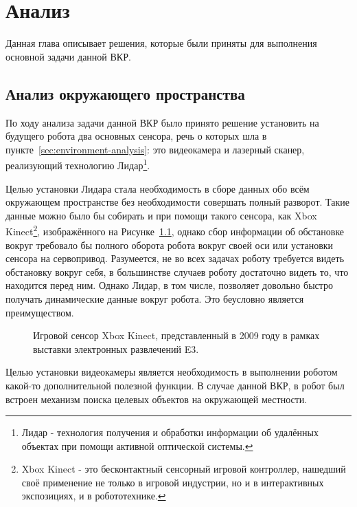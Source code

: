 \chapter{Анализ}\label{ch:ch2}

Данная глава описывает решения, которые были приняты для выполнения основной задачи данной ВКР.

\section{Анализ окружающего пространства}

По ходу анализа задачи данной ВКР было принято решение установить на будущего робота два основных сенсора, речь о которых шла в пункте~\ref{sec:environment-analysis}: это видеокамера и лазерный сканер, реализующий технологию Лидар\footnote{Лидар - технология получения и обработки информации об удалённых объектах при помощи активной оптической системы\cite[с. 20]{mather2005computer}.}.

Целью установки Лидара стала необходимость в сборе данных обо всём окружающем пространстве без необходимости совершать полный разворот. Такие данные можно было бы собирать и при помощи такого сенсора, как Xbox Kinect\footnote{Xbox Kinect - это бесконтактный сенсорный игровой контроллер, нашедший своё применение не только в игровой индустрии, но и в интерактивных экспозициях, и в робототехнике\cite{kinect-habr}.}, изображённого на Рисунке~\ref{fig:KinectSensor}, однако сбор информации об обстановке вокруг требовало бы полного оборота робота вокруг своей оси или установки сенсора на сервопривод. Разумеется, не во всех задачах роботу требуется видеть обстановку вокруг себя, в большинстве случаев роботу достаточно видеть то, что находится перед ним. Однако Лидар, в том числе, позволяет довольно быстро получать динамические данные вокруг робота. Это беусловно является преимуществом.
\begin{figure}[ht]
  \caption{Игровой сенсор Xbox Kinect, представленный в 2009 году в рамках выставки электронных развлечений E3.}\label{fig:KinectSensor}
\end{figure}

Целью установки видеокамеры является необходимость в выполнении роботом какой-то дополнительной полезной функции. В случае данной ВКР, в робот был встроен механизм поиска целевых объектов на окружающей местности.  

